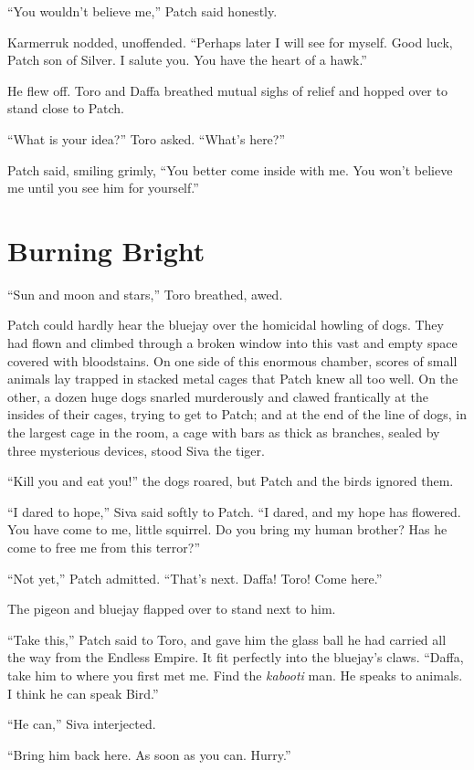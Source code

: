 \documentclass[ebook,oneside,openany,12pt]{memoir}
\begin{document}
“You wouldn’t believe me,” Patch said honestly.

Karmerruk nodded, unoffended. “Perhaps later I will see for
myself. Good luck, Patch son of Silver. I salute you. You have the
heart of a hawk.”

He flew off. Toro and Daffa breathed mutual sighs of relief and hopped
over to stand close to Patch.

“What is your idea?” Toro asked. “What’s here?”

Patch said, smiling grimly, “You better come inside with me. You won’t
believe me until you see him for yourself.”


\section{Burning Bright}

“Sun and moon and stars,” Toro breathed, awed.

Patch could hardly hear the bluejay over the homicidal howling of
dogs. They had flown and climbed through a broken window into this
vast and empty space covered with bloodstains. On one side of this
enormous chamber, scores of small animals lay trapped in stacked metal
cages that Patch knew all too well. On the other, a dozen huge dogs
snarled murderously and clawed frantically at the insides of their
cages, trying to get to Patch; and at the end of the line of dogs, in
the largest cage in the room, a cage with bars as thick as branches,
sealed by three mysterious devices, stood Siva the tiger.

“Kill you and eat you!” the dogs roared, but Patch and the birds
ignored them.

“I dared to hope,” Siva said softly to Patch. “I dared, and my hope
has flowered. You have come to me, little squirrel. Do you bring my
human brother? Has he come to free me from this terror?”

“Not yet,” Patch admitted. “That’s next. Daffa! Toro! Come here.”

The pigeon and bluejay flapped over to stand next to him.

“Take this,” Patch said to Toro, and gave him the glass ball he had
carried all the way from the Endless Empire. It fit perfectly into the
bluejay’s claws. “Daffa, take him to where you first met me. Find the
\emph{kabooti} man. He speaks to animals. I think he can speak
Bird.”

“He can,” Siva interjected.

“Bring him back here. As soon as you can. Hurry.”
\end{document}
